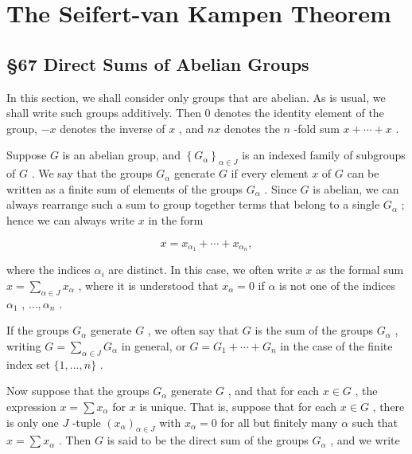 \chapter{The Seifert-van Kampen Theorem}

\section*{ \S 67 Direct Sums of Abelian Groups}

In this section, we shall consider only groups that are abelian. As is usual, we shall write such groups additively. Then 0 denotes the identity element of the group, \(- x\) denotes the inverse of \(x\) , and \({nx}\) denotes the \(n\) -fold sum \(x + \cdots  + x\) .

Suppose \(G\) is an abelian group, and \({\left\{  {G}_{\alpha }\right\}  }_{\alpha  \in  J}\) is an indexed family of subgroups of \(G\) . We say that the groups \({G}_{\alpha }\) generate \(G\) if every element \(x\) of \(G\) can be written as a finite sum of elements of the groups \({G}_{\alpha }\) . Since \(G\) is abelian, we can always rearrange such a sum to group together terms that belong to a single \({G}_{\alpha }\) ; hence we can always write \(x\) in the form

\[
x = {x}_{{\alpha }_{1}} + \cdots  + {x}_{{\alpha }_{n}},
\]

where the indices \({\alpha }_{i}\) are distinct. In this case, we often write \(x\) as the formal sum \(x = \mathop{\sum }\limits_{{\alpha  \in  J}}{x}_{\alpha }\) , where it is understood that \({x}_{\alpha } = 0\) if \(\alpha\) is not one of the indices \({\alpha }_{1}\) , \(\ldots ,{\alpha }_{n}\) .

If the groups \({G}_{\alpha }\) generate \(G\) , we often say that \(G\) is the sum of the groups \({G}_{\alpha }\) , writing \(G = \mathop{\sum }\limits_{{\alpha  \in  J}}{G}_{\alpha }\) in general, or \(G = {G}_{1} + \cdots  + {G}_{n}\) in the case of the finite index set \(\{ 1,\ldots ,n\}\) .

Now suppose that the groups \({G}_{\alpha }\) generate \(G\) , and that for each \(x \in  G\) , the expression \(x = \sum {x}_{\alpha }\) for \(x\) is unique. That is, suppose that for each \(x \in  G\) , there is only one \(J\) -tuple \({\left( {x}_{\alpha }\right) }_{\alpha  \in  J}\) with \({x}_{\alpha } = 0\) for all but finitely many \(\alpha\) such that \(x = \sum {x}_{\alpha }\) . Then \(G\) is said to be the direct sum of the groups \({G}_{\alpha }\) , and we write

